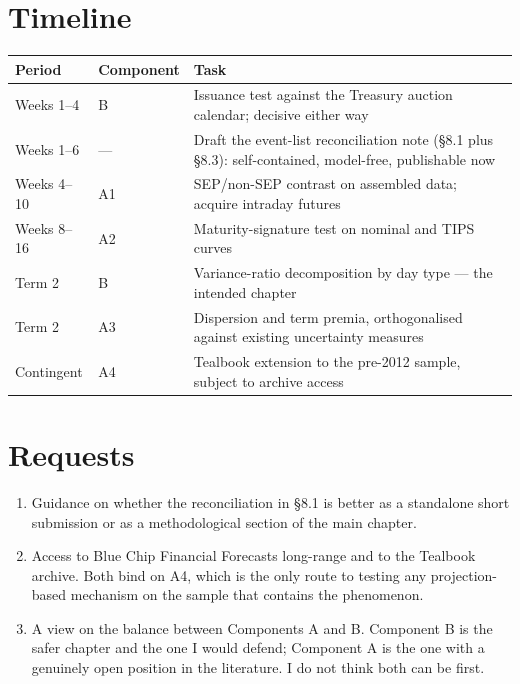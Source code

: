 \documentclass[11pt]{article}
\begin{document}
\section{Timeline}

\begin{center}\small
\begin{tabular}{@{}llp{}@{}}
\toprule
\textbf{Period} & \textbf{Component} & \textbf{Task}\\ \midrule
Weeks 1--4 & B & Issuance test against the Treasury auction calendar; decisive either way\\
Weeks 1--6 & --- & Draft the event-list reconciliation note (\S8.1 plus \S8.3): self-contained, model-free, publishable now\\
Weeks 4--10 & A1 & SEP/non-SEP contrast on assembled data; acquire intraday futures\\
Weeks 8--16 & A2 & Maturity-signature test on nominal and TIPS curves\\
Term 2 & B & Variance-ratio decomposition by day type --- the intended chapter\\
Term 2 & A3 & Dispersion and term premia, orthogonalised against existing uncertainty measures\\
Contingent & A4 & Tealbook extension to the pre-2012 sample, subject to archive access\\
\bottomrule\end{tabular}
\end{center}

\section{Requests}

\begin{enumerate}\setlength\itemsep{0.1em}
\item Guidance on whether the reconciliation in \S8.1 is better as a standalone short
submission or as a methodological section of the main chapter.
\item Access to Blue Chip Financial Forecasts long-range and to the Tealbook archive. Both
bind on A4, which is the only route to testing any projection-based mechanism on the sample
that contains the phenomenon.
\item A view on the balance between Components A and B. Component B is the safer chapter and
the one I would defend; Component A is the one with a genuinely open position in the
literature. I do not think both can be first.
\end{enumerate}
\end{document}
